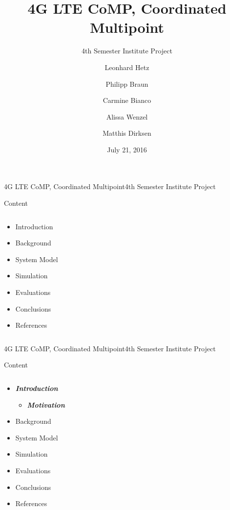 \documentclass[xcolor={cmyk}]{beamer}
\title{4G LTE CoMP, Coordinated Multipoint}
\subtitle{4th Semester Institute Project}
\author[Matthis Dirksen]{\tiny Leonhard Hetz \and Philipp Braun \and Carmine Bianco \and Alissa Wenzel \and Matthis Dirksen}
\date{July 21, 2016}
\begin{document}
\frame[plain]{\titlepage}

\begin{frame}{4G LTE CoMP, Coordinated Multipoint}{4th Semester Institute Project}
	\begin{block}{Content}
		\begin{columns}
			\begin{column}{.9\textwidth}
				\begin{itemize}
					\item Introduction
					\item Background
					\item System Model
					\item Simulation
					\item Evaluations
					\item Conclusions
					\item References
				\end{itemize}
			\end{column}
		\end{columns}
	\end{block}
\end{frame}

\begin{frame}{4G LTE CoMP, Coordinated Multipoint}{4th Semester Institute Project}
	\begin{block}{Content}
		\begin{columns}
			\begin{column}{.9\textwidth}
				\begin{itemize}
					\item \textbf{\emph{Introduction}}
					\begin{itemize}
						\item \textbf{\emph{Motivation}}
					\end{itemize}
					\item Background
					\item System Model
					\item Simulation
					\item Evaluations
					\item Conclusions
					\item References
				\end{itemize}
			\end{column}
		\end{columns}
	\end{block}
\end{frame}
\end{document}
